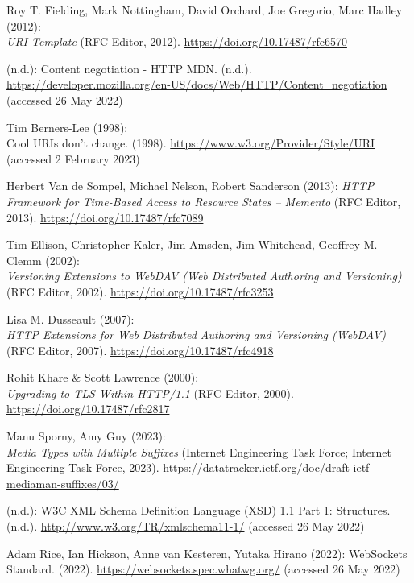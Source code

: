 \begin{thebibliography}{9}
Roy T. Fielding, Mark Nottingham, David Orchard, Joe Gregorio, Marc
Hadley (2012): \\
\emph{{URI Template}} ({RFC Editor}, 2012).
\url{https://doi.org/10.17487/rfc6570}

(n.d.): Content negotiation - {HTTP} \textbar{} {MDN}. (n.d.).
\url{https://developer.mozilla.org/en-US/docs/Web/HTTP/Content_negotiation}
(accessed 26 May 2022)

Tim Berners-Lee (1998): \\
Cool {URIs} don't change. (1998).
\url{https://www.w3.org/Provider/Style/URI} (accessed 2 February 2023)

Herbert Van de Sompel, Michael Nelson, Robert Sanderson (2013):
\emph{{HTTP Framework} for {Time-Based Access} to {Resource States} --
{Memento}} ({RFC Editor}, 2013).
\url{https://doi.org/10.17487/rfc7089}

Tim Ellison, Christopher Kaler, Jim Amsden, Jim Whitehead, Geoffrey
M. Clemm (2002): \\
\emph{Versioning {Extensions} to {WebDAV} ({Web
Distributed Authoring} and {Versioning})} ({RFC Editor}, 2002).
\url{https://doi.org/10.17487/rfc3253}

Lisa M. Dusseault (2007): \\
\emph{{HTTP Extensions} for {Web Distributed
Authoring} and {Versioning} ({WebDAV})} ({RFC Editor}, 2007).
\url{https://doi.org/10.17487/rfc4918}

Rohit Khare \& Scott Lawrence (2000): \\
\emph{Upgrading to {TLS Within
HTTP}/1.1} ({RFC Editor}, 2000).
\url{https://doi.org/10.17487/rfc2817}

Manu Sporny, Amy Guy (2023): \\
\emph{{Media Types with Multiple
Suffixes}} (Internet Engineering Task Force; Internet Engineering Task
Force, 2023).
\url{https://datatracker.ietf.org/doc/draft-ietf-mediaman-suffixes/03/}

(n.d.): {W3C XML Schema Definition Language} ({XSD}) 1.1 {Part} 1:
{Structures}. (n.d.). \url{http://www.w3.org/TR/xmlschema11-1/}
(accessed 26 May 2022)

Adam Rice, Ian Hickson, Anne van Kesteren, Yutaka Hirano (2022):
{WebSockets Standard}. (2022). \url{https://websockets.spec.whatwg.org/}
(accessed 26 May 2022)


\end{thebibliography}
